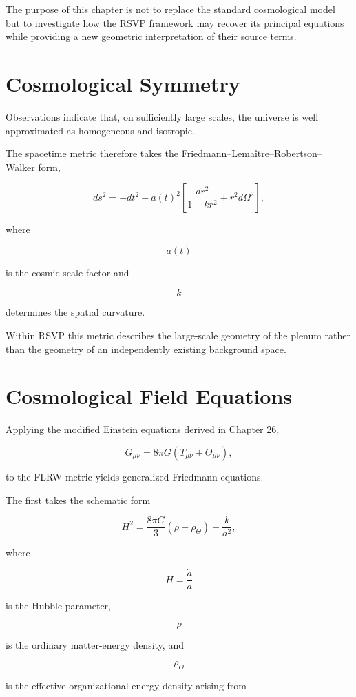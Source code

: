 \documentclass[11pt,oneside]{book}
\numberwithin{equation}{chapter}
\theoremstyle{definition}
\theoremstyle{plain}
\begin{document}
The purpose of this chapter is not to replace the standard cosmological
model but to investigate how the RSVP framework may recover its principal
equations while providing a new geometric interpretation of their source
terms.

\section{Cosmological Symmetry}

Observations indicate that, on sufficiently large scales, the universe is
well approximated as homogeneous and isotropic.

The spacetime metric therefore takes the Friedmann--Lema\^itre--Robertson--
Walker form,

\[
ds^2
=
-dt^2
+
a(t)^2
\left[
\frac{dr^2}{1-kr^2}
+
r^2d\Omega^2
\right],
\]

where

\[
a(t)
\]

is the cosmic scale factor and

\[
k
\]

determines the spatial curvature.

Within RSVP this metric describes the large-scale geometry of the plenum
rather than the geometry of an independently existing background space.

\section{Cosmological Field Equations}

Applying the modified Einstein equations derived in Chapter 26,

\[
G_{\mu\nu}
=
8\pi G
\left(
T_{\mu\nu}
+
\Theta_{\mu\nu}
\right),
\]

to the FLRW metric yields generalized Friedmann equations.

The first takes the schematic form

\[
\boxed{
H^2
=
\frac{8\pi G}{3}
\left(
\rho
+
\rho_\Theta
\right)
-
\frac{k}{a^2},
}
\]

where

\[
H
=
\frac{\dot a}{a}
\]

is the Hubble parameter,

\[
\rho
\]

is the ordinary matter-energy density, and

\[
\rho_\Theta
\]

is the effective organizational energy density arising from
\end{document}
